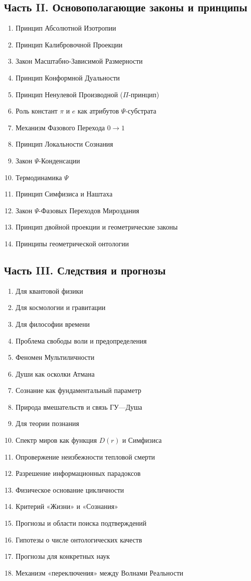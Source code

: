\documentclass[a4paper,12pt]{article}
\begin{document}
\subsection*{Часть II. Основополагающие законы и принципы}
\begin{enumerate}[label=2.\arabic*.]
	\item Принцип Абсолютной Изотропии
	\item Принцип Калибровочной Проекции
	\item Закон Масштабно-Зависимой Размерности
	\item Принцип Конформной Дуальности
	\item Принцип Ненулевой Производной ($\Pi$-принцип)
	\item Роль констант $\pi$ и $e$ как атрибутов $\Psi$-субстрата
	\item Механизм Фазового Перехода $0 \to 1$
	\item Принцип Локальности Сознания
	\item Закон $\Psi$-Конденсации
	\item Термодинамика $\Psi$
	\item Принцип Симфизиса и Наштаха
	\item Закон $\Psi$-Фазовых Переходов Мироздания
	\item Принцип двойной проекции и геометрические законы
	\item Принципы геометрической онтологии
\end{enumerate}

\subsection*{Часть III. Следствия и прогнозы}
\begin{enumerate}[label=3.\arabic*.]
	\item Для квантовой физики
	\item Для космологии и гравитации
	\item Для философии времени
	\item Проблема свободы воли и предопределения
	\item Феномен Мультиличности
	\item Души как осколки Атмана
	\item Сознание как фундаментальный параметр
	\item Природа вмешательств и связь ГУ—Душа
	\item Для теории познания
	\item Спектр миров как функция $D(r)$ и Симфизиса
	\item Опровержение неизбежности тепловой смерти
	\item Разрешение информационных парадоксов
	\item Физическое основание цикличности
	\item Критерий «Жизни» и «Сознания»
	\item Прогнозы и области поиска подтверждений
	\item Гипотезы о числе онтологических качеств
	\item Прогнозы для конкретных наук
	\item Механизм «переключения» между Волнами Реальности
\end{enumerate}
\end{document}
